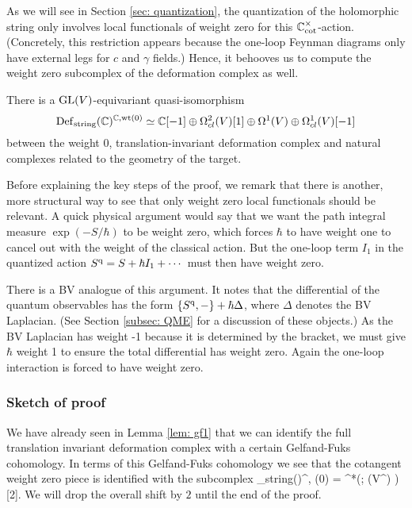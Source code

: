 As we will see in Section \ref{sec: quantization}, 
the quantization of the holomorphic string only involves local functionals of weight zero for this $\mathbb C^\times_{\rm cot}$-action.
(Concretely, this restriction appears because the one-loop Feynman diagrams only have external legs for $c$ and $\gamma$ fields.)
Hence, it behooves us to compute the weight zero subcomplex of the deformation complex as well.

\begin{lem}
\label{lem: def complex wt zero} 
There is a ${\rm GL}(V)$-equivariant quasi-isomorphism
\[
{\rm Def}_{\rm string}(\mathbb C)^{\mathbb C, {\rm wt}(0)} \simeq \mathbb C[-1] \oplus \Omega^2_{cl}(V)[1] \oplus \Omega^1(V) \oplus \Omega^1_{cl}(V)[-1] 
\]
between the weight 0, translation-invariant deformation complex 
and natural complexes related to the geometry of the target.
\end{lem}

Before explaining the key steps of the proof, 
we remark that there is another, more structural way to see that only weight zero local functionals should be relevant.
A quick physical argument would say that we want the path integral measure $\exp(-S/\hbar)$ to be weight zero,
which forces $\hbar$ to have weight one to cancel out with the weight of the classical action.
But the one-loop term $I_1$ in the quantized action $S^{\rm q} = S + \hbar I_1 + \cdots$ must then have weight zero.

There is a BV analogue of this argument.
It notes that the differential of the quantum observables has the form $\{S^{\rm q},-\} + \hbar \Delta$,
where $\Delta$ denotes the BV Laplacian.
(See Section \ref{subsec: QME} for a discussion of these objects.)
As the BV Laplacian has weight -1 because it is determined by the bracket,
we must give $\hbar$ weight 1 to ensure the total differential has weight zero.
Again the one-loop interaction is forced to have weight zero.

\subsubsection{Sketch of proof}

We have already seen in Lemma \ref{lem: gf1} that we can identify the full translation invariant deformation complex with a certain Gelfand-Fuks cohomology. 
In terms of this Gelfand-Fuks cohomology we see that the cotangent weight zero piece is identified with the subcomplex
\ben
\Def_{\rm string}(\CC)^{\CC, \wt(0)} = \cred^*\left(\wone ; \Sym(V^\vee[z^\vee]) \right) [2]. 
\een 
We will drop the overall shift by $2$ until the end of the proof. 

